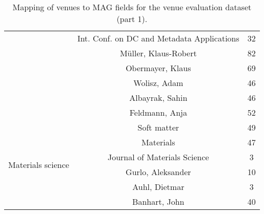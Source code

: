 \begin{table}
\begin{tabular}{|c|c|c|}
& Int. Conf. on DC and Metadata Applications & 32 \\ \cline{2-3}
& Müller, Klaus-Robert & 82 \\ \cline{2-3}
& Obermayer, Klaus & 69 \\ \cline{2-3}
& Wolisz, Adam & 46 \\ \cline{2-3}
& Albayrak, Sahin & 46 \\ \cline{2-3}
& Feldmann, Anja & 52 \\ \cline{2-3}
\hline
\multirow{6}{*}{Materials science}
& Soft matter & 49 \\ \cline{2-3}
& Materials & 47 \\ \cline{2-3}
& Journal of Materials Science & 3 \\ \cline{2-3}
& Gurlo, Aleksander & 10 \\ \cline{2-3}
& Auhl, Dietmar & 3 \\ \cline{2-3}
& Banhart, John & 40 \\ \cline{2-3}
\hline
\end{tabular}
\caption{Mapping of venues to MAG fields for the venue evaluation dataset (part 1).}
\label{tab:venue_field_map_1}
\end{table}

